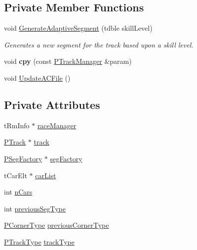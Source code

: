 \subsection*{Private Member Functions}
\begin{DoxyCompactItemize}
\item 
void \hyperlink{classprocedural_1_1_p_track_manager_ace9702e18795f58d75ad99cbbbe4305a}{Generate\-Adaptive\-Segment} (tdble skill\-Level)
\begin{DoxyCompactList}\small\item\em Generates a new segment for the track based upon a skill level. \end{DoxyCompactList}\item 
\hypertarget{classprocedural_1_1_p_track_manager_a5c1140cfabb2ceac85cd4eea4f548f3e}{void {\bfseries cpy} (const \hyperlink{classprocedural_1_1_p_track_manager}{P\-Track\-Manager} \&param)}\label{classprocedural_1_1_p_track_manager_a5c1140cfabb2ceac85cd4eea4f548f3e}

\item 
void \hyperlink{classprocedural_1_1_p_track_manager_ab1b1c85eec723f1cda23cbbbfbaad5a6}{Update\-A\-C\-File} ()
\end{DoxyCompactItemize}
\subsection*{Private Attributes}
\begin{DoxyCompactItemize}
\item 
t\-Rm\-Info $\ast$ \hyperlink{classprocedural_1_1_p_track_manager_a94e0584899b041265487236a8369969b}{race\-Manager}
\item 
\hyperlink{classprocedural_1_1_p_track}{P\-Track} $\ast$ \hyperlink{classprocedural_1_1_p_track_manager_ad648fdfaf8fc5bc7ede73760e473f325}{track}
\item 
\hyperlink{classprocedural_1_1_p_seg_factory}{P\-Seg\-Factory} $\ast$ \hyperlink{classprocedural_1_1_p_track_manager_a9382031b01b92a1b06de89f41c71bcf4}{seg\-Factory}
\item 
t\-Car\-Elt $\ast$ \hyperlink{classprocedural_1_1_p_track_manager_a48932e59eced9eb62718ce8115780498}{car\-List}
\item 
int \hyperlink{classprocedural_1_1_p_track_manager_aa41cb2a5feacb95941e3769c16f303c9}{n\-Cars}
\item 
int \hyperlink{classprocedural_1_1_p_track_manager_a9a2da179be6f3c15feb8cbda22f1b8c0}{previous\-Seg\-Type}
\item 
\hyperlink{namespaceprocedural_ac5486560c59bdf79345a041628149e91}{P\-Corner\-Type} \hyperlink{classprocedural_1_1_p_track_manager_a1e986c033a12a2b2cd602f28b1c27113}{previous\-Corner\-Type}
\item 
\hyperlink{namespaceprocedural_a4435205085ac754385168920ab245cd7}{P\-Track\-Type} \hyperlink{classprocedural_1_1_p_track_manager_a30f77747073f21bc648bd04cc3f4b5dd}{track\-Type}
\end{DoxyCompactItemize}


